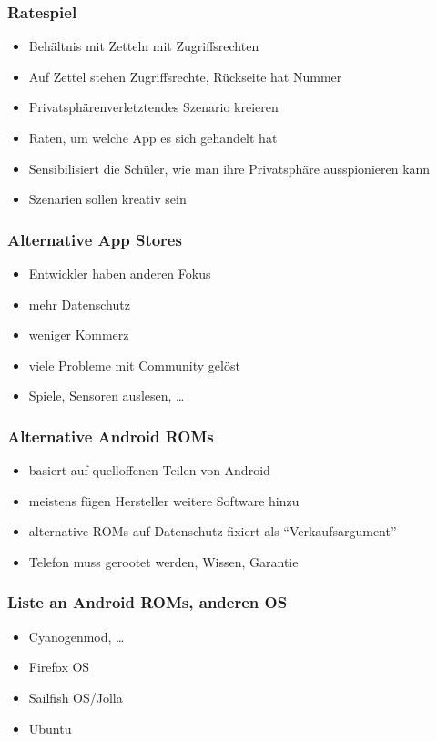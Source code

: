 \documentclass[12pt]{beamer}
\begin{document}
\begin{frame}
	\frametitle{Ratespiel}
	\begin{itemize}
		\item<2-> Behältnis mit Zetteln mit Zugriffsrechten
		\item<3-> Auf Zettel stehen Zugriffsrechte, Rückseite hat Nummer
		\item<4-> Privatsphärenverletztendes Szenario kreieren
		\item<5-> Raten, um welche App es sich gehandelt hat
		\item<6-> Sensibilisiert die Schüler, wie man ihre Privatsphäre ausspionieren kann
		\item<7-> Szenarien sollen kreativ sein
	\end{itemize}
\end{frame}

\begin{frame}
	\frametitle{Alternative App Stores}
	\begin{itemize}
		\item<2-> Entwickler haben anderen Fokus
		\item<3-> mehr Datenschutz
		\item<4-> weniger Kommerz
		\item<5-> viele Probleme mit Community gelöst
		\item<6-> Spiele, Sensoren auslesen, \ldots
	\end{itemize}
\end{frame}
\begin{frame}
	\frametitle{Alternative Android ROMs}
	\begin{itemize}
		\item<2-> basiert auf quelloffenen Teilen von Android
		\item<3-> meistens fügen Hersteller weitere Software hinzu
		\item<4-> alternative ROMs auf Datenschutz fixiert als "`Verkaufsargument"'
		\item<5-> Telefon muss gerootet werden, Wissen, Garantie
	\end{itemize}
\end{frame}

\begin{frame}
	\frametitle{Liste an Android ROMs, anderen OS}
	\begin{itemize}
		\item<2-> Cyanogenmod, \ldots
		\item<3-> Firefox OS
		\item<4-> Sailfish OS/Jolla
		\item<5-> Ubuntu
	\end{itemize}
\end{frame}
\end{document}
